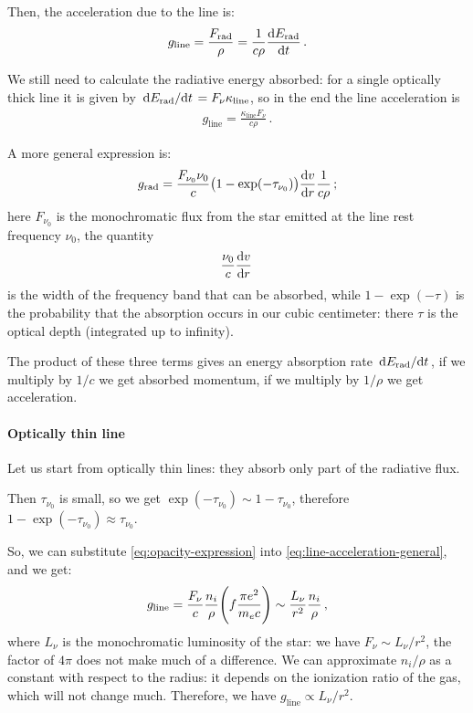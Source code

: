 \documentclass[main.tex]{subfiles}
\begin{document}
Then, the acceleration due to the line is:
%
\begin{align} \label{eq:line-acceleration-general}
  g _{\text{line}} = \frac{F _{\text{rad}}}{\rho }
  = \frac{1}{c \rho } \dv{E _{\text{rad}}}{t}
\,.
\end{align}
 
We still need to calculate the radiative energy absorbed: for a single optically thick line it is given by \(\dv*{E _{\text{rad}}}{t} = F_{\nu } \kappa _{\text{line}}\), so in the end the line acceleration is 
%
\begin{align}
g _{\text{line}} = \frac{\kappa _{\text{line}} F_{\nu }}{c \rho }
\,.
\end{align}
%

A more general expression is:
%
\begin{align}
  g _{\text{rad}} = \frac{F_{\nu_0} \nu_0 }{c} \qty(1 - \exp(- \tau_{\nu_0 }) ) \dv{v}{r} \frac{1}{c \rho }
\,;
\end{align}
%
here \(F_{\nu_0}\) is the monochromatic flux from the star emitted at the line rest frequency \(\nu_0 \), the quantity 
%
\begin{align}
  \frac{\nu_0}{c} \dv{v}{r}
\,
\end{align}
%
is the width of the frequency band that can be absorbed, while \(1 - \exp(-\tau ) \) is the probability that the absorption occurs in our cubic centimeter: there \(\tau \) is the optical depth (integrated up to infinity).

The product of these three terms gives an energy absorption rate \(\dv*{E _{\text{rad}}}{t}\), if we multiply by \(1/c\) we get absorbed momentum, if we multiply by \(1/ \rho \) we get acceleration.

\paragraph{Optically thin line}

Let us start from optically thin lines: they absorb only part of the radiative flux.

Then \(\tau_{\nu_0 } \) is small, so we get \(\exp(-\tau_{\nu_0 }) \sim 1- \tau_{\nu_0 } \), therefore \(1- \exp(-\tau_{\nu_0 }) \approx \tau_{\nu_0 } \).


So, we can substitute \eqref{eq:opacity-expression} into \eqref{eq:line-acceleration-general}, and we get:
%
\begin{align}
g_{\text{line}} = \frac{F_{\nu }}{c} \frac{n_i}{\rho } \qty(f \frac{\pi e^2}{m_e c}) \sim \frac{L_{\nu }}{r^2} \frac{n_i}{\rho }
\,,
\end{align}
%
where \(L_{\nu }\) is the monochromatic luminosity of the star: we have \(F_{\nu } \sim L_{\nu }/ r^2\), the factor of \(4 \pi \) does not make much of a difference.
We can approximate \(n_i / \rho \) as a constant with respect to the radius: it depends on the ionization ratio of the gas, which will not change much. Therefore, we have \(g _{\text{line}} \propto L_{\nu } / r^2\).
\end{document}
